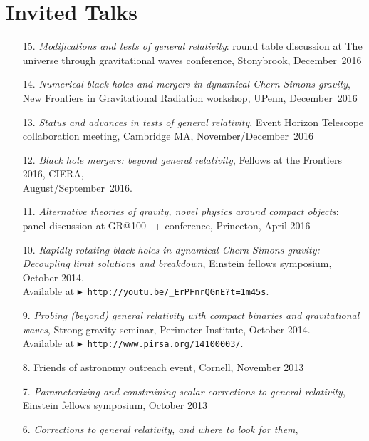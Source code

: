 \newcommand{\playsymbol}{$\blacktriangleright$}
\section{\sc Invited Talks}
\begin{enumerate}
\item[{15.}] {\it Modifications and tests of general relativity}:
  round table discussion at
  The universe through gravitational waves conference,
  Stonybrook, December~2016
\item[{14.}] {\it Numerical black holes and mergers in dynamical
    Chern-Simons gravity},
  New Frontiers in Gravitational Radiation workshop, UPenn, December~2016
\item[{13.}] {\it Status and advances in tests of general relativity},
  Event Horizon Telescope collaboration meeting, Cambridge MA,
  November/December~2016
\item[{12.}] {\it Black hole mergers: beyond general relativity},
  Fellows at the Frontiers 2016, CIERA,\\ August/September~2016.
\item[{11.}] {\it Alternative theories of gravity, novel physics
    around compact objects}: panel discussion at GR@100++ conference,
  Princeton, April 2016
\item[{10.}] {\it Rapidly rotating black holes in dynamical Chern-Simons gravity:
    Decoupling limit solutions and breakdown},
 Einstein fellows symposium, October 2014.\\
 Available at \href{http://youtu.be/_ErPFnrQGnE?t=1m45s}{\playsymbol~\texttt{http://youtu.be/\_ErPFnrQGnE?t=1m45s}}.
\item[{9.}] {\it Probing (beyond) general relativity with compact binaries and
    gravitational waves},
  Strong gravity seminar, Perimeter Institute, October 2014.\\
  Available at \href{http://www.pirsa.org/14100003/}{\playsymbol~\texttt{http://www.pirsa.org/14100003/}}.
\item[{8.}]
  Friends of astronomy outreach event, Cornell, November 2013
\item[{7.}] {\it Parameterizing and constraining scalar corrections to general relativity},
  Einstein fellows symposium, October 2013
\item[{6.}] {\it Corrections to general relativity, and where to look for them},

\end{enumerate}
